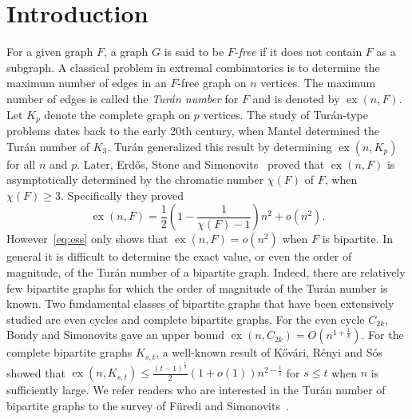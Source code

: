 \documentclass[11pt,a4paper]{article}
\theoremstyle{definition}
\DeclareMathOperator{\ex}{ex}
\begin{document}

    \section{Introduction}\label{sec:intro}

        For a given graph $F$, a graph $G$ is said to be {\it $F$-free} if it does not contain $F$ as a subgraph.
        A classical problem in extremal combinatorics is to determine the maximum number of edges in an $F$-free graph on $n$ vertices.
        The maximum number of edges is called the \emph{Tur\'{a}n number} for $F$ and is denoted by $\ex(n, F)$.
        Let $K_p$ denote the complete graph on $p$ vertices.
        The study of Tur\'an-type problems dates back to the early 20th century, when Mantel \cite{mantel1907} determined the Tur\'an number of $K_3$.
        Tur\'an \cite{TuranEgy1941} generalized this result by determining $\ex(n,K_p)$ for all $n$ and $p$.
        Later, Erd\H{o}s, Stone and Simonovits~\cite{ErdosA1966, ErdosOn1946} proved that $\ex(n,F)$ is asymptotically determined by the chromatic number $\chi(F)$ of $F$, when $\chi(F)\ge 3$.  Specifically they proved
        \begin{equation}\label{eq:ess}
            \ex(n,F)=\frac{1}{2}\left(1-\frac{1}{\chi(F)-1}\right)n^2 + o(n^2).
        \end{equation}
        However~\eqref{eq:ess} only shows that $\ex(n, F) = o(n^2)$ when $F$ is bipartite.
        In general it is difficult to determine the exact value, or even the order of magnitude, of the Tur\'an number of a bipartite graph.
        Indeed, there are relatively few bipartite graphs for which the order of magnitude of the Tur\'{a}n number is known.
        Two fundamental classes of bipartite graphs that have been extensively studied are even cycles and complete bipartite graphs.
        For the even cycle $C_{2k}$, Bondy and Simonovits \cite{bondy1974cycles} gave an upper bound $\ex(n, C_{2k}) = O(n^{1+\frac{1}{k}})$.
        For the complete bipartite graphs $K_{s,t}$, a well-known result of K\H{o}v\'{a}ri, R\'{e}nyi and S\'{o}s \cite{kst} showed that $\ex(n, K_{s,t}) \leq \frac{(t-1)^{\frac{1}{s}}}{2}(1+o(1))n^{2-\frac{1}{s}}$ for $s \leq t$ when $n$ is sufficiently large.
        We refer readers who are interested in the Tur\'an number of bipartite graphs to the survey of F\"{u}redi and Simonovits~\cite{FurediThe2013}.
\end{document}
